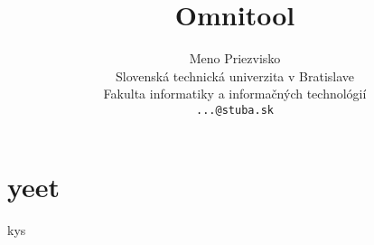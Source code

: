 \documentclass[10pt,slovak,a4paper]{IEEEtran}
\title{Omnitool}
\author{Meno Priezvisko\\[2pt]
	{\small Slovenská technická univerzita v Bratislave}\\
	{\small Fakulta informatiky a informačných technológií}\\
	{\small \texttt{...@stuba.sk}}
	}
\begin{document}
\maketitle

\section{yeet}
kys
\end{document}
